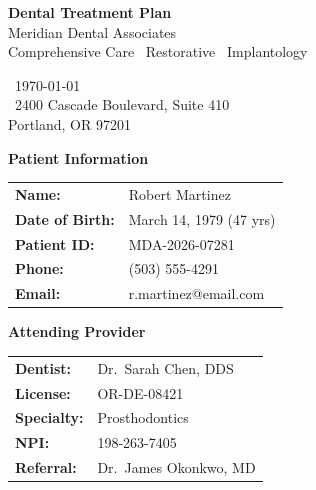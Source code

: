 \documentclass[11pt,a4paper]{article}
\begin{document}
\begin{tcolorbox}[
  colback=primary,
  colframe=primary,
  arc=0mm,
  boxrule=0pt,
  left=6mm,
  right=6mm,
  top=4mm,
  bottom=4mm,
  sharp corners=northwest,
  sharp corners=northeast,
]
  \begin{minipage}[c]{0.65\textwidth}
    {\LARGE\bfseries\color{white}Dental Treatment Plan}\\[2mm]
    {\large\color{secondary!80}Meridian Dental Associates}\\[1mm]
    {\small\color{white!85}Comprehensive Care \textbar\  Restorative \textbar\  Implantology}
  \end{minipage}%
  \begin{minipage}[c]{0.35\textwidth}
    \raggedleft
    {\small\color{white!85}\faCalendar\ \today}\\[1mm]
    {\small\color{white!85}\faMapMarker*\ 2400 Cascade Boulevard, Suite 410}\\[1mm]
    {\small\color{white!85}Portland, OR 97201}
  \end{minipage}
\end{tcolorbox}

\vspace{3mm}

\begin{infobox}
  \begin{minipage}[t]{0.48\textwidth}
    {\bfseries\color{primary}Patient Information}\\[3mm]
    \begin{tabular}{@{}p{2.8cm} p{4.2cm}@{}}
      \textbf{Name:} & Robert Martinez \\
      \textbf{Date of Birth:} & March 14, 1979 (47 yrs)\\
      \textbf{Patient ID:} & MDA-2026-07281\\
      \textbf{Phone:} & (503) 555-4291\\
      \textbf{Email:} & r.martinez@email.com\\
    \end{tabular}
  \end{minipage}\hfill%
  \begin{minipage}[t]{0.48\textwidth}
    {\bfseries\color{primary}Attending Provider}\\[3mm]
    \begin{tabular}{@{}p{2.8cm} p{4.2cm}@{}}
      \textbf{Dentist:} & Dr.\ Sarah Chen, DDS\\
      \textbf{License:} & OR-DE-08421\\
      \textbf{Specialty:} & Prosthodontics\\
      \textbf{NPI:} & 198-263-7405\\
      \textbf{Referral:} & Dr.\ James Okonkwo, MD\\
    \end{tabular}
  \end{minipage}
\end{infobox}
\end{document}
